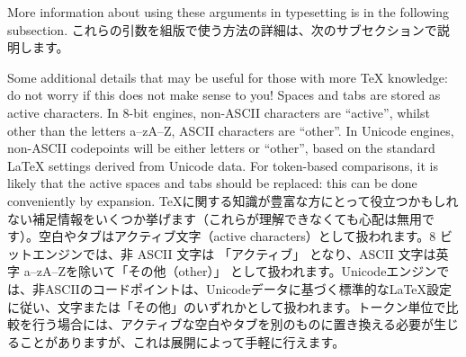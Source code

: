 \documentclass{ltxguide}
\newcommand\jpnewline{\vspace{3pt}\newline}
\DeclareRobustCommand{\jpquote}[1]{「#1」}
\begin{document}
More information about using these arguments in typesetting is in the following
subsection.
\jpnewline
これらの引数を組版で使う方法の詳細は、次のサブセクションで説明します。

Some additional details that may be useful for those with more \TeX{}
knowledge: do not worry if this does not make sense to you! Spaces and tabs are
stored as active characters. In $8$-bit engines, non-ASCII characters are
\enquote{active}, whilst other than the letters a--zA--Z, ASCII characters are
\enquote{other}. In Unicode engines, non-ASCII codepoints will be either
letters or \enquote{other}, based on the standard \LaTeX{} settings derived
from Unicode data. For token-based comparisons, it is likely that the active
spaces and tabs should be replaced: this can be done conveniently by expansion.
\jpnewline
\TeX{}に関する知識が豊富な方にとって役立つかもしれない補足情報をいくつか挙げます（これらが理解できなくても心配は無用です）。空白やタブはアクティブ文字（active characters）として扱われます。8 ビットエンジンでは、非 ASCII 文字は \jpquote{アクティブ} となり、ASCII 文字は英字 a--zA--Zを除いて\jpquote{その他（other）} として扱われます。Unicodeエンジンでは、非ASCIIのコードポイントは、Unicodeデータに基づく標準的な\LaTeX{}設定に従い、文字または\jpquote{その他}のいずれかとして扱われます。トークン単位で比較を行う場合には、アクティブな空白やタブを別のものに置き換える必要が生じることがありますが、これは展開によって手軽に行えます。
\end{document}
